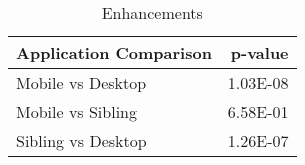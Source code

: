 \begin{table}[ht]
\centering
\caption{Enhancements} 
\begin{tabular}{lr}
  \hline
Application Comparison & p-value \\ 
  \hline
Mobile vs Desktop & 1.03E-08 \\ 
  Mobile vs Sibling & 6.58E-01 \\ 
  Sibling vs Desktop & 1.26E-07 \\ 
   \hline
\end{tabular}
\label{tab:enhancements}
\end{table}
